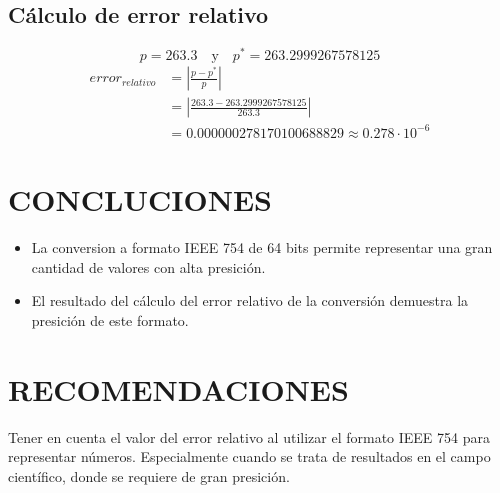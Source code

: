 \documentclass[12pt]{article}
\begin{document}
\subsection*{Cálculo de error relativo}
\[p = 263.3 \quad \text{y} \quad p^{*} = 263.2999267578125\]
\[
\begin{aligned}
    error_{relativo} &= \left| \frac{p - p^{*}}{p} \right|\\
                     &= \left| \frac{263.3 - 263.2999267578125}{263.3} \right|\\
                     &= 0.000000278170100688829 \approx 0.278 \cdot 10^{-6}
\end{aligned}
\]  
\section*{CONCLUCIONES}
\begin{itemize}
    \item {La conversion a formato IEEE 754 de 64 bits permite representar una gran cantidad de valores con alta presición.}
    \item {El resultado del cálculo del error relativo de la conversión demuestra la presición de este formato.} 
\end{itemize}

\section*{RECOMENDACIONES}

Tener en cuenta el valor del error relativo al utilizar el formato IEEE 754 para representar números.
Especialmente cuando se trata de resultados en el campo científico, donde se requiere de gran presición.
\renewcommand{\refname}{\MakeUppercase{REFERENCIAS}}


\end{document}
